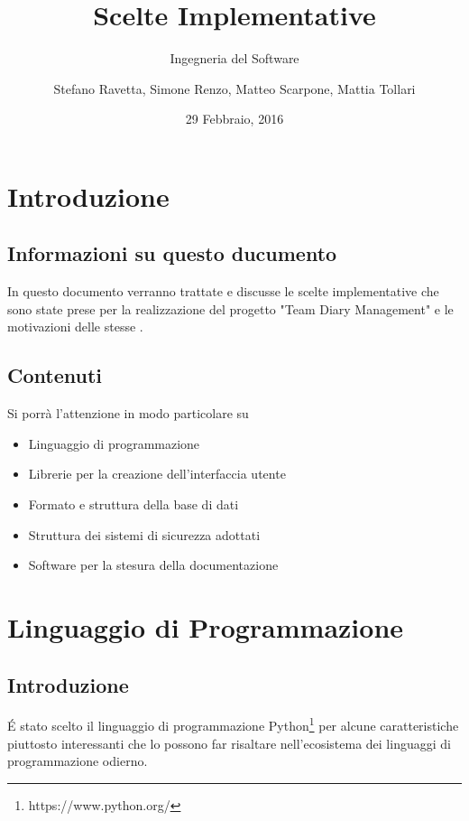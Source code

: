 \documentclass[12pt]{scrartcl}
\title{Scelte Implementative}
\subtitle{Ingegneria del Software}
\author{Stefano Ravetta, Simone Renzo, Matteo Scarpone, Mattia Tollari}
\date{29 Febbraio, 2016}
\begin{document}
\maketitle


\section{Introduzione}	%

\subsection{Informazioni su questo ducumento}
In questo documento verranno trattate e discusse le scelte
implementative che sono state prese per la realizzazione del progetto "Team Diary Management"
e le motivazioni delle stesse .

\subsection{Contenuti}
Si porr\`a l'attenzione in modo particolare su
\begin{itemize}
    \item Linguaggio di programmazione
    \item Librerie per la creazione dell'interfaccia utente
    \item Formato e struttura della base di dati
    \item Struttura dei sistemi di sicurezza adottati
    \item Software per la stesura della documentazione
\end{itemize}

\section{Linguaggio di Programmazione}
\subsection{Introduzione}
\'E stato scelto il linguaggio di programmazione Python\footnote{https://www.python.org/} per alcune caratteristiche
piuttosto interessanti che lo possono far risaltare nell'ecosistema dei linguaggi di programmazione odierno.
\end{document}
